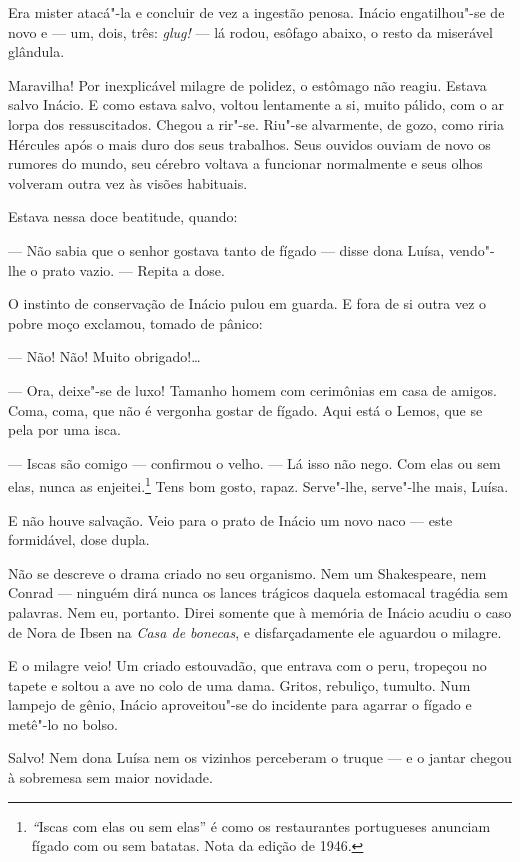 Era mister atacá"-la e concluir de vez a ingestão penosa. Inácio
engatilhou"-se de novo e --- um, dois, três: \emph{glug!} --- lá rodou,
esôfago abaixo, o resto da miserável glândula.

Maravilha! Por inexplicável milagre de polidez, o estômago não reagiu.
Estava salvo Inácio. E como estava salvo, voltou lentamente a si, muito
pálido, com o ar lorpa dos ressuscitados. Chegou a rir"-se. Riu"-se
alvarmente, de gozo, como riria Hércules após o mais duro dos seus
trabalhos. Seus ouvidos ouviam de novo os rumores do mundo, seu cérebro
voltava a funcionar normalmente e seus olhos volveram outra vez às
visões habituais.

Estava nessa doce beatitude, quando:

--- Não sabia que o senhor gostava tanto de fígado --- disse dona Luísa,
vendo"-lhe o prato vazio. --- Repita a dose.

O instinto de conservação de Inácio pulou em guarda. E fora de si outra
vez o pobre moço exclamou, tomado de pânico:

--- Não! Não! Muito obrigado!\ldots{}

--- Ora, deixe"-se de luxo! Tamanho homem com cerimônias em casa de
amigos. Coma, coma, que não é vergonha gostar de fígado. Aqui está o
Lemos, que se pela por uma isca.

--- Iscas são comigo --- confirmou o velho. --- Lá isso não nego. Com
elas ou sem elas, nunca as enjeitei.\footnote{\emph{``}Iscas com elas ou
  sem elas'' é como os restaurantes portugueses anunciam fígado com ou
  sem batatas. Nota da edição de 1946.} Tens bom gosto, rapaz.
Serve"-lhe, serve"-lhe mais, Luísa.

E não houve salvação. Veio para o prato de Inácio um novo naco --- este
formidável, dose dupla.

Não se descreve o drama criado no seu organismo. Nem um Shakespeare, nem
Conrad --- ninguém dirá nunca os lances trágicos daquela estomacal
tragédia sem palavras. Nem eu, portanto. Direi somente que à memória de
Inácio acudiu o caso de Nora de Ibsen na \emph{Casa de bonecas}, e
disfarçadamente ele aguardou o milagre.

E o milagre veio! Um criado estouvadão, que entrava com o peru, tropeçou
no tapete e soltou a ave no colo de uma dama. Gritos, rebuliço, tumulto.
Num lampejo de gênio, Inácio aproveitou"-se do incidente para agarrar o
fígado e metê"-lo no bolso.

Salvo! Nem dona Luísa nem os vizinhos perceberam o truque --- e o jantar
chegou à sobremesa sem maior novidade.

